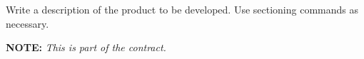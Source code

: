 

Write a description of the product to be developed.
Use sectioning commands as necessary.
\vspace{2\baselineskip}

\centerline{\Large {\bf NOTE:} {\em This is part of the contract.}}

